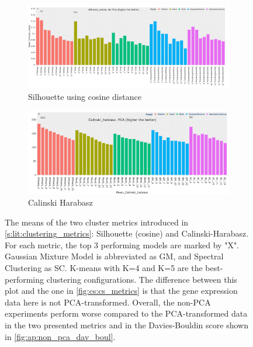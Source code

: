 \begin{figure}[H]
    \centering
    \begin{subfigure}[!t]{1.0\textwidth}
        \includegraphics[width=\textwidth,keepaspectratio]{Sections/ClusteringAnalysis/Resources/cs_top3/non_PCA_top3_Silhoute_cosine.png}
        \caption{Silhouette using cosine distance}
        \label{fig:ap:cosine}
    \end{subfigure}
    \centering
    \begin{subfigure}[!t]{1.0\textwidth}
        \includegraphics[width=\textwidth,keepaspectratio]{Sections/ClusteringAnalysis/Resources/cs_top3/PCA_top3_Calinski_habrasz.png}
        \caption{Calinski Harabasz}
        \label{fig:ap:cal_hab}
    \end{subfigure}
    \caption[Non-PCA transformed data: Silhouette and Calinski-Harabasz]{The means of the two cluster metrics introduced in \cref{s:lit:clustering_metrics}: Silhouette (cosine) and Calinski-Harabasz. For each metric, the top 3 performing models are marked by "X". Gaussian Mixture Model is abbreviated as GM, and Spectral Clustering as SC. K-means with K=4 and K=5 are the best-performing clustering configurations. The difference between this plot and the one in \cref{fig:cs:cs_metrics} is that the gene expression data here is not PCA-transformed. Overall, the non-PCA experiments perform worse compared to the PCA-transformed data in the two presented metrics and in the Davies-Bouldin score shown in \cref{fig:ap:non_pca_dav_boul}.}
    \label{fig:ap:non_pca_metrics}
\end{figure}

